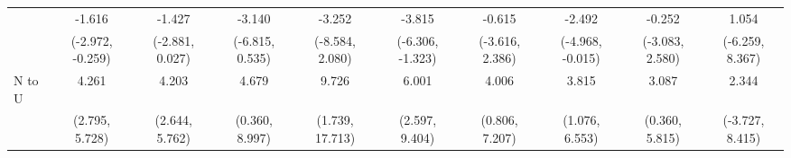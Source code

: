{\begin{tabular}{l|c|c|c|c|c|c|c|c|c}
& -1.616 & -1.427 & -3.140 & -3.252 & -3.815 & -0.615 & -2.492 & -0.252 & 1.054 \\
& {\scriptsize (-2.972, -0.259)}
& {\scriptsize (-2.881, 0.027)}
& {\scriptsize (-6.815, 0.535)}
& {\scriptsize (-8.584, 2.080)}
& {\scriptsize (-6.306, -1.323)}
& {\scriptsize (-3.616, 2.386)}
& {\scriptsize (-4.968, -0.015)}
& {\scriptsize (-3.083, 2.580)}
& {\scriptsize (-6.259, 8.367)}
\\ [0.1cm]
\hline
N to U
& 4.261 & 4.203 & 4.679 & 9.726 & 6.001 & 4.006 & 3.815 & 3.087 & 2.344 \\
& {\scriptsize (2.795, 5.728)}
& {\scriptsize (2.644, 5.762)}
& {\scriptsize (0.360, 8.997)}
& {\scriptsize (1.739, 17.713)}
& {\scriptsize (2.597, 9.404)}
& {\scriptsize (0.806, 7.207)}
& {\scriptsize (1.076, 6.553)}
& {\scriptsize (0.360, 5.815)}
& {\scriptsize (-3.727, 8.415)}
\\ [0.1cm]
\hline
\hline
\end{tabular}
}
